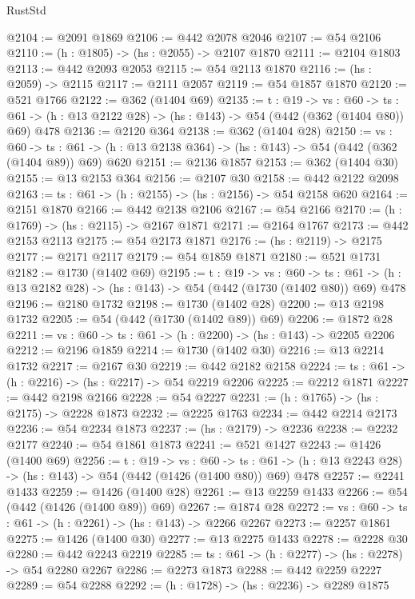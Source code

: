 \begin{lexlean}{RustStd}
\begin{coremodule}
@2104 := @2091 @1869
@2106 := @442 @2078 @2046
@2107 := @54 @2106
@2110 := (h : @1805) -> (hs : @2055) -> @2107 @1870
@2111 := @2104 @1803
@2113 := @442 @2093 @2053
@2115 := @54 @2113 @1870
@2116 := (hs : @2059) -> @2115
@2117 := @2111 @2057
@2119 := @54 @1857 @1870
@2120 := @521 @1766
@2122 := @362 (@1404 @69)
@2135 := {t : @19} ->
  {vs : @60} ->
  {ts : @61} -> (h : @13 @2122 @28) -> (hs : @143) -> @54 (@442 (@362 (@1404 @80)) @69) @478
@2136 := @2120 @364
@2138 := @362 (@1404 @28)
@2150 := {vs : @60} ->
  {ts : @61} -> (h : @13 @2138 @364) -> (hs : @143) -> @54 (@442 (@362 (@1404 @89)) @69) @620
@2151 := @2136 @1857
@2153 := @362 (@1404 @30)
@2155 := @13 @2153 @364
@2156 := @2107 @30
@2158 := @442 @2122 @2098
@2163 := {ts : @61} -> (h : @2155) -> (hs : @2156) -> @54 @2158 @620
@2164 := @2151 @1870
@2166 := @442 @2138 @2106
@2167 := @54 @2166
@2170 := (h : @1769) -> (hs : @2115) -> @2167 @1871
@2171 := @2164 @1767
@2173 := @442 @2153 @2113
@2175 := @54 @2173 @1871
@2176 := (hs : @2119) -> @2175
@2177 := @2171 @2117
@2179 := @54 @1859 @1871
@2180 := @521 @1731
@2182 := @1730 (@1402 @69)
@2195 := {t : @19} ->
  {vs : @60} ->
  {ts : @61} -> (h : @13 @2182 @28) -> (hs : @143) -> @54 (@442 (@1730 (@1402 @80)) @69) @478
@2196 := @2180 @1732
@2198 := @1730 (@1402 @28)
@2200 := @13 @2198 @1732
@2205 := @54 (@442 (@1730 (@1402 @89)) @69)
@2206 := @1872 @28
@2211 := {vs : @60} -> {ts : @61} -> (h : @2200) -> (hs : @143) -> @2205 @2206
@2212 := @2196 @1859
@2214 := @1730 (@1402 @30)
@2216 := @13 @2214 @1732
@2217 := @2167 @30
@2219 := @442 @2182 @2158
@2224 := {ts : @61} -> (h : @2216) -> (hs : @2217) -> @54 @2219 @2206
@2225 := @2212 @1871
@2227 := @442 @2198 @2166
@2228 := @54 @2227
@2231 := (h : @1765) -> (hs : @2175) -> @2228 @1873
@2232 := @2225 @1763
@2234 := @442 @2214 @2173
@2236 := @54 @2234 @1873
@2237 := (hs : @2179) -> @2236
@2238 := @2232 @2177
@2240 := @54 @1861 @1873
@2241 := @521 @1427
@2243 := @1426 (@1400 @69)
@2256 := {t : @19} ->
  {vs : @60} ->
  {ts : @61} -> (h : @13 @2243 @28) -> (hs : @143) -> @54 (@442 (@1426 (@1400 @80)) @69) @478
@2257 := @2241 @1433
@2259 := @1426 (@1400 @28)
@2261 := @13 @2259 @1433
@2266 := @54 (@442 (@1426 (@1400 @89)) @69)
@2267 := @1874 @28
@2272 := {vs : @60} -> {ts : @61} -> (h : @2261) -> (hs : @143) -> @2266 @2267
@2273 := @2257 @1861
@2275 := @1426 (@1400 @30)
@2277 := @13 @2275 @1433
@2278 := @2228 @30
@2280 := @442 @2243 @2219
@2285 := {ts : @61} -> (h : @2277) -> (hs : @2278) -> @54 @2280 @2267
@2286 := @2273 @1873
@2288 := @442 @2259 @2227
@2289 := @54 @2288
@2292 := (h : @1728) -> (hs : @2236) -> @2289 @1875

\end{coremodule}
\end{lexlean}

